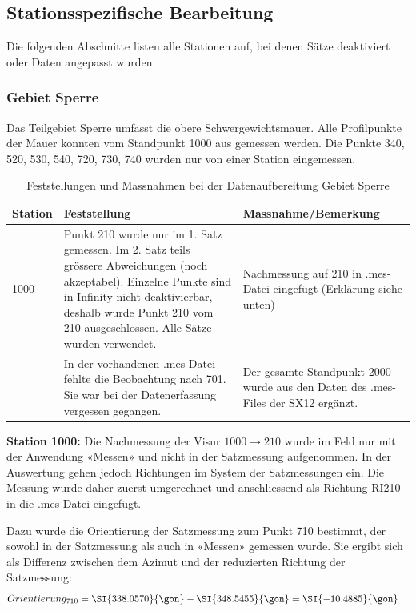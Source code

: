 \subsection{Stationsspezifische Bearbeitung}
\label{sec:stationsspezifische_bearbeitung}
Die folgenden Abschnitte listen alle Stationen auf, bei denen Sätze deaktiviert oder
Daten angepasst wurden.

\subsubsection{Gebiet Sperre}
\label{sec:gebiet_sperre}
Das Teilgebiet Sperre umfasst die obere Schwergewichtsmauer. Alle Profilpunkte
der Mauer konnten vom Standpunkt 1000 aus gemessen werden. Die Punkte 340, 520, 530, 540, 720, 730,
740 wurden nur von einer Station eingemessen.

\begin{table}[H]
    \centering
    \begin{tabular}{p{1.5cm} p{6cm} p{5.5cm}}
        \toprule
        Station & Feststellung & Massnahme/Bemerkung \\
        \midrule
        1000 & Punkt 210 wurde nur im 1. Satz gemessen. Im 2. Satz teils
        grössere Abweichungen (noch akzeptabel). Einzelne Punkte sind in
        Infinity nicht deaktivierbar, deshalb wurde Punkt 210 vom 210 ausgeschlossen.
        Alle Sätze wurden verwendet.
        & Nachmessung auf 210 in .mes-Datei eingefügt (Erklärung siehe unten) \\
        \addlinespace
        2000 & In der vorhandenen .mes-Datei fehlte die Beobachtung nach
        701. Sie war bei der Datenerfassung vergessen gegangen.
        & Der gesamte Standpunkt 2000 wurde aus den Daten des .mes-Files der SX12 ergänzt. \\
        \bottomrule
    \end{tabular}
    \caption{Feststellungen und Massnahmen bei der Datenaufbereitung Gebiet Sperre}
    \label{tab:feststellungen}
\end{table}

\textbf{Station 1000:} Die Nachmessung der Visur $1000 \rightarrow 210$ wurde im Feld
nur mit der Anwendung «Messen» und nicht in der Satzmessung aufgenommen. In der
Auswertung gehen jedoch Richtungen im System der Satzmessungen ein. Die Messung wurde
daher zuerst umgerechnet und anschliessend als Richtung RI210 in die .mes-Datei eingefügt.

Dazu wurde die Orientierung der Satzmessung zum Punkt 710 bestimmt, der sowohl in der
Satzmessung als auch in «Messen» gemessen wurde. Sie ergibt sich als Differenz zwischen
dem Azimut und der reduzierten Richtung der Satzmessung:
\begin{align*}
    Orientierung_{710} &= \SI{338.0570}{\gon} - \SI{348.5455}{\gon} = \SI{-10.4885}{\gon}
\end{align*}

